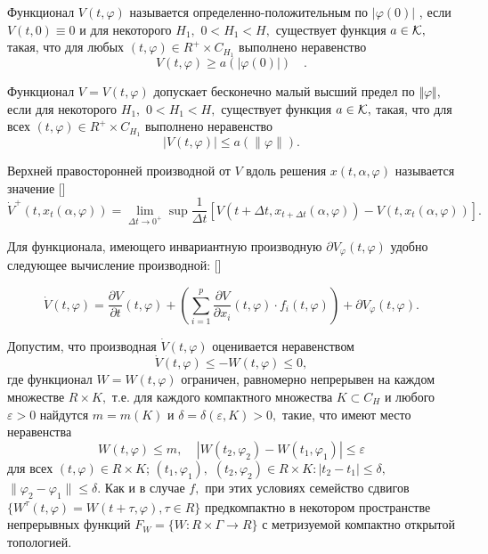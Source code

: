 	Функционал $V(t,\varphi )$ называется
		оп\-ре\-де\-лен\-но-по\-ло\-жи\-тель\-ным по $|\varphi(0)|$ , если $V(t,0)\equiv 0$ и для некоторого $H_1,$
		$0<H_1<H,$ существует функция $a\in {\cal K},$ такая, что для
		любых $(t,\varphi) \in R^+\times C_{H_1}$ выполнено неравенство $$
		V(t,\varphi )\ge a(|\varphi (0)|)\quad. $$
	
	Функционал $V=V(t,\varphi )$ допускает бесконечно
		малый высший предел по $\Vert \varphi \Vert,$ если для некоторого
		$H_1,$ $0<H_1<H,$ существует функция $a\in {\cal K},$ такая, что
		для всех  $(t,\varphi) \in R^+\times C_{H_1}$ выполнено
		неравенство $$ |V(t,\varphi )|\le a(\|\varphi\| ). $$
	
	Верхней правосторонней производной от $V$ вдоль решения $x(t,\alpha,\varphi )$
	называется значение []
	\begin{equation}\label{der42}
	\dot V^+(t,x_t(\alpha,\varphi ))=\lim\limits_{\Delta t\to
		0^+}\sup\frac1{\Delta t}\left[ V(t+\Delta t,x_{t+\Delta t}(\alpha
	,\varphi ))-V(t,x_t(\alpha,\varphi ))\right].
	\end{equation}
	
	Для функционала, имеющего инвариантную производную $\partial V_{\varphi} (t, \varphi)$ удобно следующее вычисление производной: []
	
	\begin{equation}\label{1.3}
	\dot V(t,\varphi)=\frac{\partial V}{\partial t}(t,\varphi)+
	\left( \sum\limits_{i=1}^p\frac{\partial V}{\partial
		x_i}(t,\varphi )\cdot f_i(t,\varphi )\right) +\partial
	V_{\varphi}(t,\varphi ).
	\end{equation}

Допустим, что производная $\dot V(t,\varphi )$ оценивается неравенством
\begin{equation}
\dot V(t,\varphi )\le -W(t,\varphi )\le 0, \label{3.3'}
\end{equation}
где функционал $W=W(t,\varphi )$ ограничен, равномерно непрерывен
на каждом множестве $R \times K,$ т.е. для каждого компактного
множества $K\subset C_H$ и любого $\varepsilon >0$ найдутся
$m=m(K)$ и $\delta =\delta (\varepsilon ,K)>0,$ такие, что имеют
место неравенства
\begin{equation}
W(t,\varphi )\le m,\ \ \ \ \ |W(t_2,\varphi _2)-W(t_1,\varphi
_1)|\le\varepsilon \label{3.4'}
\end{equation}
для всех $(t,\varphi )\in R \times K$; $(t_1,\varphi _1),$
$(t_2,\varphi _2)\in R \times K : |t_2-t_1|\le \delta,$
$\|\varphi _2-\varphi _1\|\le\delta.$
Как и в случае $f,$ при этих  условиях семейство сдвигов $\{
W^{\tau }(t,\varphi )=W(t+\tau ,\varphi ), \tau\in R\}$
предкомпактно в некотором пространстве непрерывных функций
$F_{W}=\{ W : R\times\Gamma\to R\}$  с метризуемой компактно
открытой топологией.

